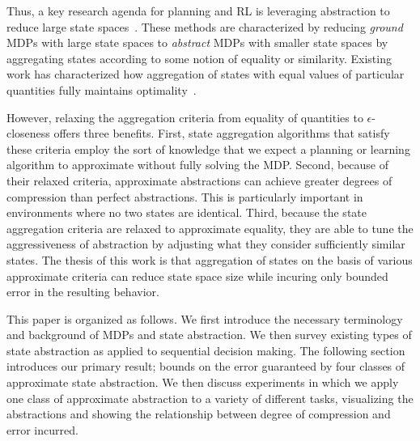 Thus, a key research agenda for planning and \ac{RL} is leveraging abstraction to reduce large state spaces~\cite{andre2002state,jong2005state,dietterich2000hierarchical,Bean2011}. These methods are characterized by reducing \textit{ground} MDPs with large state spaces to \textit{abstract} MDPs with smaller state spaces by aggregating states according to some notion of equality or similarity. Existing work has characterized how aggregation of states with equal values of particular quantities fully maintains optimality~\cite{li2006towards,dean1997modelmin}. 

However, relaxing the aggregation criteria from equality of quantities to $\epsilon$-closeness offers three benefits. First, state aggregation algorithms that satisfy these criteria employ the sort of knowledge that we expect a planning or learning algorithm to approximate without fully solving the \ac{MDP}. Second, because of their relaxed criteria, approximate abstractions can achieve greater degrees of compression than perfect abstractions. This is particularly important in environments where no two states are identical.  Third, because the state aggregation criteria are relaxed to approximate equality, they are able to tune the aggressiveness of abstraction by adjusting what they consider sufficiently similar states. The thesis of this work is that aggregation of states on the basis of various approximate criteria can reduce state space size while incuring only bounded error in the resulting behavior.

This paper is organized as follows. We first introduce the necessary terminology and background of \acp{MDP} and state abstraction. We then survey existing types of state abstraction as applied to sequential decision making. The following section introduces our primary result; bounds on the error guaranteed by four classes of approximate state abstraction. We then discuss experiments in which we apply one class of approximate abstraction to a variety of different tasks, visualizing the abstractions and showing the relationship between degree of compression and error incurred.
